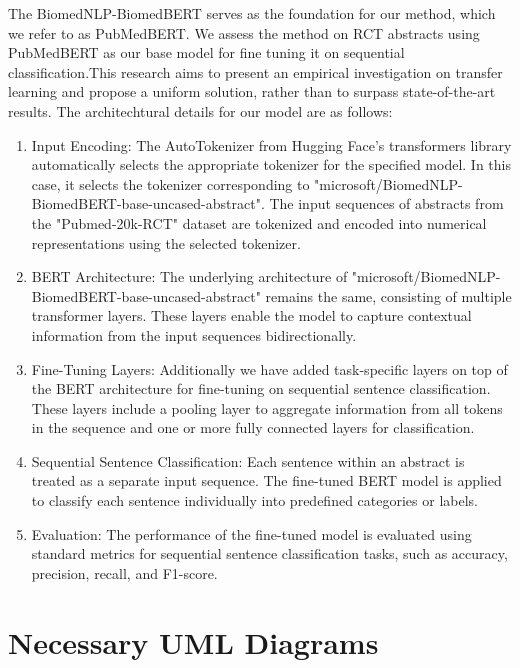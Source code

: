 \documentclass[12pt,a4paper]{report}     %
\begin{document}
\begin{normalsize}
{{ The BiomedNLP-BiomedBERT serves as the foundation for our method, which we refer to as PubMedBERT. We assess the method on RCT abstracts using PubMedBERT as our base model for fine tuning it on sequential classification.This research aims to present an empirical investigation on transfer learning and propose a uniform solution, rather than to surpass state-of-the-art results. The architechtural details for our model are as follows: \\
 \begin{enumerate}[label=\Roman*., itemsep=10pt]
    \item Input Encoding:
          The AutoTokenizer from Hugging Face's transformers library automatically selects the appropriate tokenizer for the specified model. In this case, it selects the tokenizer corresponding to "microsoft/BiomedNLP-BiomedBERT-base-uncased-abstract". The input sequences of abstracts from the "Pubmed-20k-RCT" dataset are tokenized and encoded into numerical representations using the selected tokenizer.
    \item BERT Architecture:
          The underlying architecture of "microsoft/BiomedNLP-BiomedBERT-base-uncased-abstract" remains the same, consisting of multiple transformer layers. These layers enable the model to capture contextual information from the input sequences bidirectionally.
    \item Fine-Tuning Layers:
          Additionally we have added task-specific layers on top of the BERT architecture for fine-tuning on sequential sentence classification. These layers include a pooling layer to aggregate information from all tokens in the sequence and one or more fully connected layers for classification.
    \item Sequential Sentence Classification:
          Each sentence within an abstract is treated as a separate input sequence. The fine-tuned BERT model is applied to classify each sentence individually into predefined categories or labels.
    \item Evaluation:
          The performance of the fine-tuned model is evaluated using standard metrics for sequential sentence classification tasks, such as accuracy, precision, recall, and F1-score.
    
\end{enumerate}
}
\section{Necessary UML Diagrams}
{\setlength{\baselineskip}{1.1\baselineskip}
}}
\end{normalsize}
\end{document}
